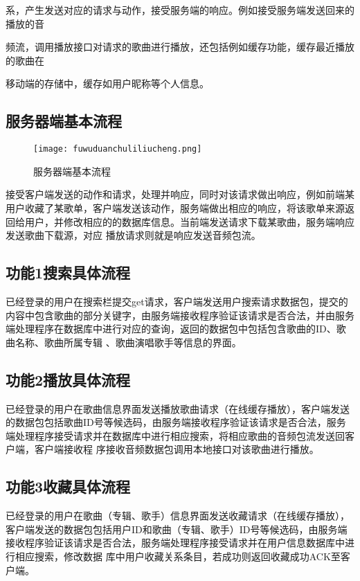 系，产生发送对应的请求与动作，接受服务端的响应。例如接受服务端发送回来的播放的音

频流，调用播放接口对请求的歌曲进行播放，还包括例如缓存功能，缓存最近播放的歌曲在

移动端的存储中，缓存如用户昵称等个人信息。

\subsection{服务器端基本流程}

\begin{figure}[H]
	\centering
	\texttt{[image: fuwuduanchuliliucheng.png]}
	\caption{服务器端基本流程} 
	\label{fig:figure8ds}
\end{figure}
接受客户端发送的动作和请求，处理并响应，同时对该请求做出响应，例如前端某用户收藏了某歌单，客户端发送该动作，服务端做出相应的响应，将该歌单来源返回给用户，并修改相应的的数据库信息。当前端发送请求下载某歌曲，服务端响应发送歌曲下载源，对应 播放请求则就是响应发送音频包流。

\subsection{功能1搜索具体流程}

已经登录的用户在搜索栏提交get请求，客户端发送用户搜索请求数据包，提交的内容中包含歌曲的部分关键字，由服务端接收程序验证该请求是否合法，并由服务端处理程序在数据库中进行对应的查询，返回的数据包中包括包含歌曲的ID、歌曲名称、歌曲所属专辑 、歌曲演唱歌手等信息的界面。

\subsection{功能2播放具体流程}

 已经登录的用户在歌曲信息界面发送播放歌曲请求（在线缓存播放），客户端发送的数据包包括歌曲ID号等候选码，由服务端接收程序验证该请求是否合法，服务端处理程序接受请求并在数据库中进行相应搜索，将相应歌曲的音频包流发送回客户端，客户端接收程 序接收音频数据包调用本地接口对该歌曲进行播放。


\subsection{功能3收藏具体流程}


已经登录的用户在歌曲（专辑、歌手）信息界面发送收藏请求（在线缓存播放），客户端发送的数据包包括用户ID和歌曲（专辑、歌手）ID号等候选码，由服务端接收程序验证该请求是否合法，服务端处理程序接受请求并在用户信息数据库中进行相应搜索，修改数据 库中用户收藏关系条目，若成功则返回收藏成功ACK至客户端。

